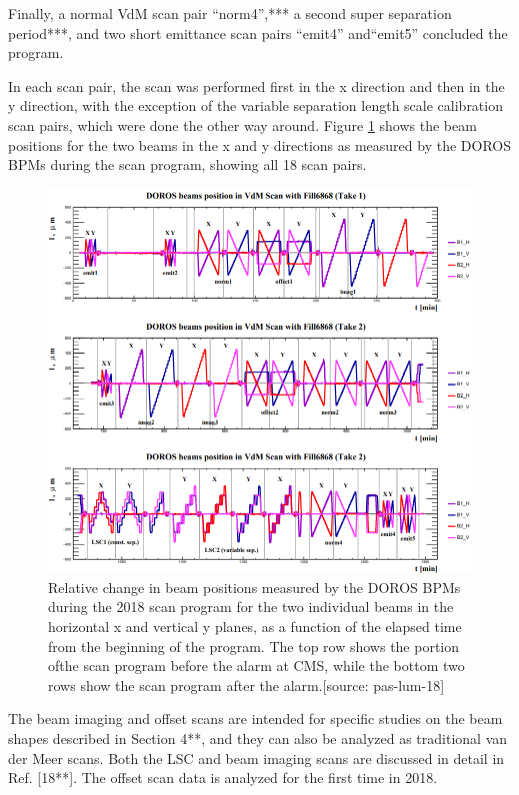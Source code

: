 Finally, a normal VdM scan pair “norm4”,*** a second super separation period***,  and two short emittance scan pairs “emit4” and“emit5” concluded the program.


In each scan pair, the scan was performed first in the x direction and then in the y direction, with the exception of the variable separation length scale calibration scan pairs, which were done the other way around.
Figure \ref{2018sp} shows the beam positions for the two beams in the x and y directions as measured by the DOROS BPMs during the scan program, showing all 18 scan pairs.
\begin{center}
    \begin{figure}[H]
        \centering
        \includegraphics[scale=0.5]{Chapter3/2018Scanprogram.png}
        \caption[2018 San program.]{Relative change in beam positions measured by the DOROS BPMs during the 2018 scan program for the two individual beams in the horizontal x and vertical y planes, as a function of the elapsed time from the beginning of the program. The top row shows the portion ofthe scan program before the alarm at CMS, while the bottom two rows show the scan program after the alarm.[source: pas-lum-18]}
        \label{2018sp}
    \end{figure}
\end{center}

The beam imaging and offset scans are intended for specific studies on the beam shapes described in Section 4**, and they can also be analyzed as traditional van der Meer scans. Both the LSC and beam imaging scans are discussed in detail in Ref. [18**]. The offset scan data is analyzed for the first time in 2018.

